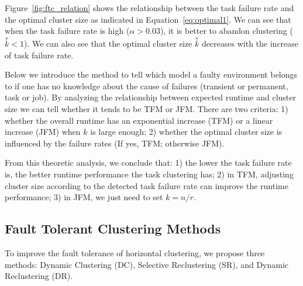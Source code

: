 Figure~\ref{fig:ftc_relation} shows the relationship between the task failure rate and the optimal cluster size as indicated in Equation~\ref{eq:optimal1}. We can see that when the task failure rate is high ($\alpha>0.03$), it is better to abandon clustering ($\overset{*}{k}<1$).  We can also see that the optimal cluster size $\overset{*}{k}$ decreases with the increase of task failure rate. 

Below we introduce the method to tell which model a faulty environment belongs to if one has no knowledge about the cause of failures (transient or permanent, task or job). By analyzing the relationship between expected runtime and cluster size we can tell whether it tends to be TFM or JFM.  There are two criteria: 1) whether the overall runtime has an exponential increase (TFM) or a linear increase (JFM) when $k$ is large enough; 2) whether the optimal cluster size is influenced by the failure rates (If yes, TFM; otherwise JFM).

From this theoretic analysis, we conclude that: 1) the lower the task failure rate is, the better runtime performance the task clustering has; 2) in TFM, adjusting cluster size according to the detected task failure rate can improve the runtime performance; 3) in JFM, we just need to set $k=n/r$. 

\subsection{Fault Tolerant Clustering Methods}
To improve the fault tolerance of horizontal clustering, we propose three methods: Dynamic Clustering (DC), Selective Reclustering (SR), and Dynamic Reclustering (DR). 

